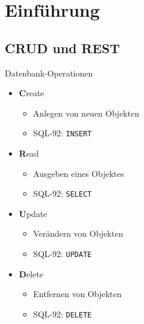 \section{Einführung}


\subsection{CRUD und REST}


\begin{frame}{Datenbank-Operationen}
    \begin{itemize}
    \item
        \textbf{C}reate
        \pause
        \begin{itemize}
            \item Anlegen von neuen Objekten
            \pause
            \item SQL-92: \texttt{INSERT}
        \end{itemize}
    \pause
    \item
        \textbf{R}ead
        \pause
        \begin{itemize}
            \item Ausgeben eines Objektes
            \pause
            \item SQL-92: \texttt{SELECT}
        \end{itemize}
    \pause
    \item
        \textbf{U}pdate
        \pause
        \begin{itemize}
            \item Verändern von Objekten
            \pause
            \item SQL-92: \texttt{UPDATE}
        \end{itemize}
    \pause
    \item
        \textbf{D}elete
        \pause
        \begin{itemize}
            \item Entfernen von Objekten
            \pause
            \item SQL-92: \texttt{DELETE}
        \end{itemize}
    \end{itemize}
\end{frame}

